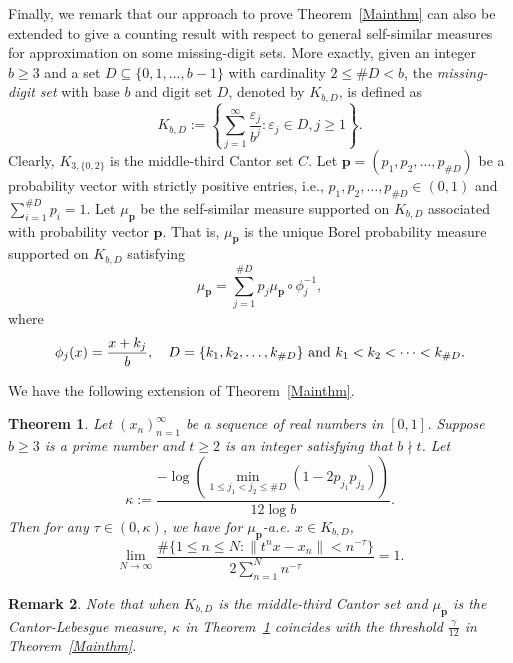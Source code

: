\documentclass[amssymb,amsfonts,refcheck,12pt,verbatim,righttag]{amsart}
\numberwithin{equation}{section} %
\newtheorem{thm}{Theorem}[section]
\newtheorem{rem}[thm]{Remark}
\theoremstyle{plain}
\begin{document}
Finally, we remark that our approach to prove Theorem~\ref{Mainthm} can also be extended to  give a counting result with respect to general  self-similar measures for approximation on some missing-digit sets. More exactly, given an integer $b\geq 3$ and a set  $D\subseteq\{0,1,\ldots,b-1\}$ with cardinality  $2\leq \#D<b$, the {\em missing-digit set} with base $b$ and digit set $D$, denoted by $K_{b,D}$, is defined as
\[K_{b,D}:=\left\{\sum_{j=1}^{\infty}\frac{\varepsilon_j}{b^j}: \varepsilon_j\in D, j\geq 1\right\}.\]
Clearly, $K_{3,\{0,2\}}$ is the middle-third Cantor set $C$. Let $\mathbf{p}=(p_{1},p_{2},\ldots,p_{\#D})$ be a probability vector with strictly positive entries, i.e., $p_{1},p_{2},\ldots,p_{\#D}\in(0,1)$ and $\sum_{i=1}^{\#D}p_{i}=1$. Let $\mu_{\mathbf{p}}$ be the self-similar measure supported on $K_{b,D}$ associated with probability vector $\textbf{p}$. That is, $\mu_{\textbf{p}}$ is the unique Borel probability measure supported on $K_{b,D}$ satisfying 
\[\mu_{\mathbf{p}}=\sum_{j=1}^{\#D}p_j\mu_{\mathbf{p}}\circ\phi_j^{-1},\]
where 
\[\phi_j(x)=\frac{x+k_j}{b}, \quad D=\{k_1,k_2,\ldots, k_{\#D}\}\ {\rm and}\  k_1<k_2<\cdots<k_{\#D}.\]

We have the following extension of Theorem~\ref{Mainthm}.
\begin{thm}\label{thmsselfsimilar}
	Let $(x_{n})_{n=1}^{\infty}$ be a sequence of real numbers in $[0,1]$. Suppose $b\geq3$ is a prime number and $t\geq2$ is an integer satisfying that $b\nmid t$. Let  $$\kappa :=\frac{-\log\left(\min\limits_{1\leq j_{1}<j_{2}\leq\#D}(1-2p_{j_{1}}p_{j_{2}})\right)}{12\log b}.$$ Then for any $\tau\in(0,\kappa)$, we have for $\mu_{\textbf{p}}$-a.e. $x\in K_{b,D}$,
	$$\lim_{N\to\infty}\frac{\#\{1\leq n\leq N:\|t^{n}x-x_{n}\|<n^{-\tau}\}}{2\sum_{n=1}^{N}n^{-\tau}}=1.$$
\end{thm}

\begin{rem}
Note that when $K_{b,D}$ is the middle-third Cantor set and $\mu_{\textbf{p}}$ is the Cantor-Lebesgue measure, $\kappa$ in Theorem~\ref{thmsselfsimilar} coincides with the threshold $\frac{\gamma}{12}$ in Theorem~\ref{Mainthm}. 
\end{rem}
\end{document}
